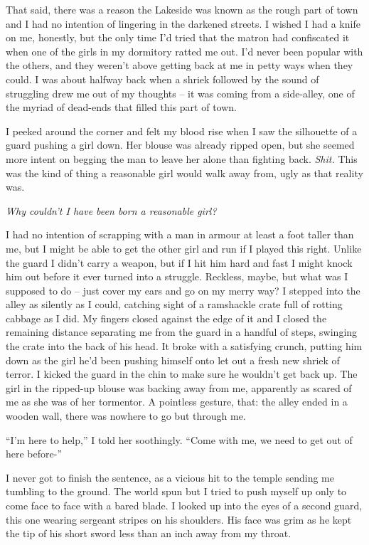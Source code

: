 \documentclass[12pt, openany]{book}
\begin{document}
That said, there was a reason the Lakeside was known as the rough part of town and I had no intention of lingering in the darkened streets. I wished I had a knife on me, honestly, but the only time I’d tried that the matron had confiscated it when one of the girls in my dormitory ratted me out. I’d never been popular with the others, and they weren’t above getting back at me in petty ways when they could. I was about halfway back when a shriek followed by the sound of struggling drew me out of my thoughts – it was coming from a side-alley, one of the myriad of dead-ends that filled this part of town. 

I peeked around the corner and felt my blood rise when I saw the silhouette of a guard pushing a girl down. Her blouse was already ripped open, but she seemed more intent on begging the man to leave her alone than fighting back. \textit{Shit.} This was the kind of thing a reasonable girl would walk away from, ugly as that reality was.

\textit{Why couldn’t I have been born a reasonable girl?}

I had no intention of scrapping with a man in armour at least a foot taller than me, but I might be able to get the other girl and run if I played this right. Unlike the guard I didn’t carry a weapon, but if I hit him hard and fast I might knock him out before it ever turned into a struggle. Reckless, maybe, but what was I supposed to do – just cover my ears and go on my merry way? I stepped into the alley as silently as I could, catching sight of a ramshackle crate full of rotting cabbage as I did. My fingers closed against the edge of it and I closed the remaining distance separating me from the guard in a handful of steps, swinging the crate into the back of his head. It broke with a satisfying crunch, putting him down as the girl he’d been pushing himself onto let out a fresh new shriek of terror. I kicked the guard in the chin to make sure he wouldn’t get back up. The girl in the ripped-up blouse was backing away from me, apparently as scared of me as she was of her tormentor. A pointless gesture, that: the alley ended in a wooden wall, there was nowhere to go but through me.

“I’m here to help,” I told her soothingly. “Come with me, we need to get out of here before-”

I never got to finish the sentence, as a vicious hit to the temple sending me tumbling to the ground. The world spun but I tried to push myself up only to come face to face with a bared blade. I looked up into the eyes of a second guard, this one wearing sergeant stripes on his shoulders. His face was grim as he kept the tip of his short sword less than an inch away from my throat.
\end{document}
